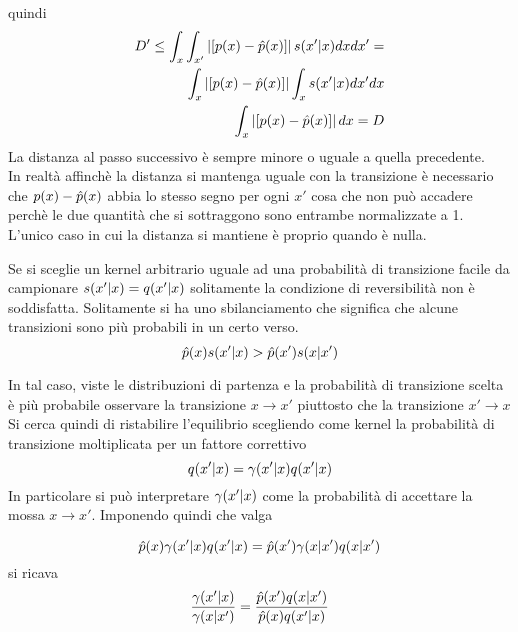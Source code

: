 quindi
\begin{equation}
\begin{split}
D'\leq\int_{x}\int_{x'} \left\vert[p(x)-\hat{p}(x)]\right\vert  s(x'|x)dx dx'=\\
 \int_{x}\left\vert[p(x)-\hat{p}(x)]\right\vert   \int_{x}s(x'|x)dx'dx \\
 \int_{x} \left\vert[p(x)-\hat{p}(x)]\right\vert dx =D\\
\end{split}
\end{equation}
La distanza al passo successivo è sempre minore o uguale a quella precedente.\\
In realtà affinchè la distanza si mantenga uguale con la transizione è necessario che $p(x)-\hat{p}(x)$ abbia lo stesso segno per ogni $x'$
cosa che non può accadere perchè le due quantità che si sottraggono sono entrambe normalizzate a 1.\\
L'unico caso in cui la distanza si mantiene è proprio quando è nulla.






Se si sceglie un kernel arbitrario uguale ad una probabilità   di transizione facile
da campionare $s(x'|x) = q(x'|x) $ solitamente la condizione di reversibilità   non è   
soddisfatta. Solitamente si ha uno sbilanciamento che significa che alcune transizioni
sono più  probabili in un certo verso.
\begin{equation}
\hat{p}(x)s(x'|x)>\hat{p}(x')s(x|x')
\end{equation}

In tal caso, viste le distribuzioni di partenza e la probabilità   di transizione scelta è   
più  probabile osservare la transizione $x\rightarrow x'$ piuttosto che la transizione $x'\rightarrow x$
\\Si cerca quindi di ristabilire l’equilibrio scegliendo come kernel la probabilità   di
transizione moltiplicata per un fattore correttivo 
\begin{equation}
q(x'|x) = \gamma(x'|x)q(x'|x)
\end{equation}
In particolare si può  interpretare $\gamma(x'|x)$ come la probabilità   di accettare la mossa $x \rightarrow x'$. Imponendo quindi che valga


\begin{equation}
\hat{p}(x)\gamma(x'|x)q(x'|x)=\hat{p}(x')\gamma(x|x')q(x|x')
\end{equation}
si ricava
\begin{equation}
\frac{\gamma(x'|x)}{\gamma(x|x')}=\frac{\hat{p}(x')q(x|x')}{\hat{p}(x)q(x'|x)}
\end{equation}

